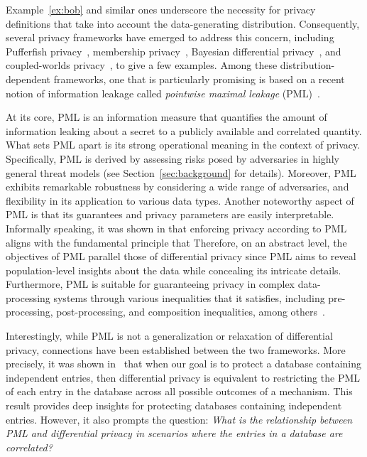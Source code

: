 Example~\ref{ex:bob} and similar ones underscore the necessity for privacy definitions that take into account the data-generating distribution. Consequently, several privacy frameworks have emerged to address this concern, including Pufferfish privacy~\cite{kiferPufferfishFrameworkMathematical2014}, membership privacy~\cite{liMembershipPrivacyUnifying2013}, Bayesian differential privacy~\cite{yang2015bayesian}, and coupled-worlds privacy~\cite{bassily2013coupled}, to give a few examples. Among these distribution-dependent frameworks, one that is particularly promising is based on a recent notion of information leakage called \emph{pointwise maximal leakage} (PML)~\cite{saeidian2023pointwise_it,saeidian2023pointwise_isit}. 

At its core, PML is an information measure that quantifies the amount of information leaking about a secret to a publicly available and correlated quantity. What sets PML apart is its strong operational meaning in the context of privacy. Specifically, PML is derived by assessing risks posed by adversaries in highly general threat models (see Section~\ref{sec:background} for details). Moreover, PML exhibits remarkable robustness by considering a wide range of adversaries, and flexibility in its application to various data types. Another noteworthy aspect of PML is that its guarantees and privacy parameters are easily interpretable. Informally speaking, it was shown in \cite{inferential_privacy} that enforcing privacy according to PML aligns with the fundamental principle that  Therefore, on an abstract level, the objectives of PML parallel those of differential privacy since PML aims to reveal population-level insights about the data while concealing its intricate details. Furthermore, PML is suitable for guaranteeing privacy in complex data-processing systems through various inequalities that it satisfies, including pre-processing, post-processing, and composition inequalities, among others~\cite[Lemma 1]{saeidian2023pointwise_it}.


Interestingly, while PML is not a generalization or relaxation of differential privacy, connections have been established between the two frameworks.  More precisely, it was shown in~\cite[Thm. 4.2]{inferential_privacy} that when our goal is to protect a database containing independent entries, then differential privacy is equivalent to restricting the PML of each entry in the database across all possible outcomes of a mechanism. This result provides deep insights for protecting databases containing independent entries. However, it also prompts the question: \emph{What is the relationship between PML and differential privacy in scenarios where the entries in a database are correlated?}

